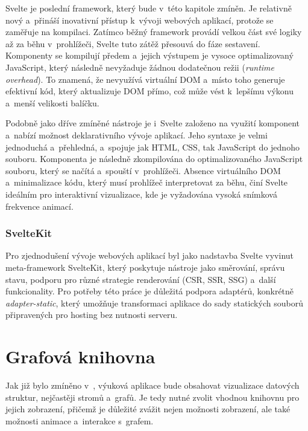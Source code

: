 Svelte je poslední framework, který bude v~této kapitole zmíněn.
Je relativně nový a~přináší inovativní přístup k~vývoji webových aplikací, protože se zaměřuje na kompilaci.
Zatímco běžný framework provádí velkou část své logiky až za běhu v~prohlížeči, Svelte tuto zátěž přesouvá do fáze sestavení.
Komponenty se kompilují předem a~jejich výstupem je vysoce optimalizovaný JavaScript, který následně nevyžaduje žádnou dodatečnou režii (\textit{runtime overhead}).
To znamená, že nevyužívá virtuální DOM a~místo toho generuje efektivní kód, který aktualizuje DOM přímo, což může vést k~lepšímu výkonu a~menší velikosti balíčku.~\cite{svelte}

Podobně jako dříve zmíněné nástroje je i~Svelte založeno na využití komponent a~nabízí možnost deklarativního vývoje aplikací.
Jeho syntaxe je velmi jednoduchá a~přehledná, a~spojuje jak HTML, CSS, tak JavaScript do jednoho souboru.
Komponenta je následně zkompilována do optimalizovaného JavaScript souboru, který se načítá a~spouští v~prohlížeči.
Absence virtuálního DOM a~minimalizace kódu, který musí prohlížeč interpretovat za běhu, činí Svelte ideálním pro interaktivní vizualizace, kde je vyžadována vysoká snímková frekvence animací.~\cite{svelte}

\subsubsection*{SvelteKit}

Pro zjednodušení vývoje webových aplikací byl jako nadstavba Svelte vyvinut meta-framework SvelteKit, který poskytuje nástroje jako směrování, správu stavu, podporu pro různé strategie renderování (CSR, SSR, SSG) a~další funkcionality.
Pro potřeby této práce je důležitá podpora adaptérů, konkrétně \textit{adapter-static}, který umožňuje transformaci aplikace do sady statických souborů připravených pro hosting bez nutnosti serveru.~\cite{svelte}

\section{Grafová knihovna}
\label{sec:graph_library}

Jak již bylo zmíněno v~, výuková aplikace bude obsahovat vizualizace datových struktur, nejčastěji stromů a~grafů.
Je tedy nutné zvolit vhodnou knihovnu pro jejich zobrazení, přičemž je důležité zvážit nejen možnosti zobrazení, ale také možnosti animace a~interakce s~grafem.

